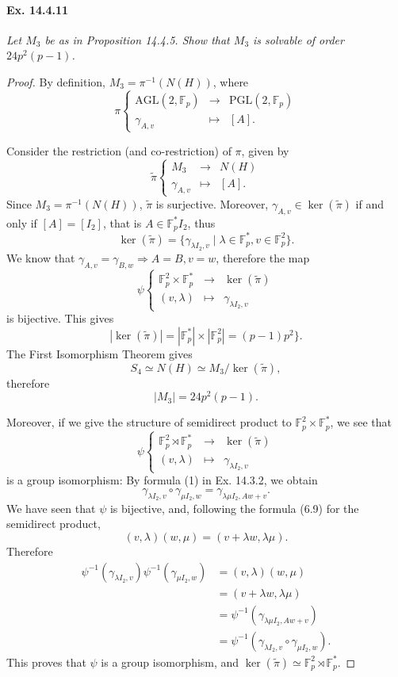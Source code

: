 \documentclass[11pt,a4paper]{article}
\newcommand{\F}{\mathbb{F}}
\begin{document}
{\paragraph{Ex. 14.4.11}{\it Let $M_3$ be as in Proposition 14.4.5. Show that $M_3$ is solvable of order $24p^2(p-1)$.
}
\begin{proof}
By definition, $M_3 = \pi^{-1}(N(H))$, where
$$
\pi
\left\{
\begin{array}{ccc}
\mathrm{AGL}(2,\F_p) & \to & \mathrm{PGL}(2,\F_p)\\
\gamma_{A,v} & \mapsto &[A].
\end{array}
\right.
$$

Consider the restriction (and co-restriction) of $\pi$, given by
$$
\tilde{\pi}
\left\{
\begin{array}{ccc}
M_3& \to &N(H)\\
\gamma_{A,v} & \mapsto &[A].
\end{array}
\right.
$$
Since $M_3 = \pi^{-1}(N(H))$, $\tilde{\pi}$ is surjective.
Moreover, $\gamma_{A,v} \in \ker(\tilde{\pi})$ if and only if $[A] = [I_2]$, that is $A \in \F_p^* I_2$, thus
$$\ker(\tilde{\pi}) = \{ \gamma_{\lambda I_2, v} \mid \lambda \in \F_p^*, v \in \F_p^2\}.$$
We know that $\gamma_{A,v} = \gamma_{B,w} \Rightarrow A = B, v = w$, therefore the map
$$
\psi
\left\{
\begin{array}{ccc}
 \F_p^2\times \F_p^* & \to &\ker(\tilde \pi)\\
(v, \lambda) & \mapsto & \gamma_{\lambda I_2,v}
\end{array} 
\right.
$$
is bijective. This gives
$$
|\ker(\tilde{\pi})| = |\F_p^*| \times |\F_p^2| = (p-1)p^2\}.
$$
The First Isomorphism Theorem gives
$$S_4 \simeq N(H) \simeq M_3/ \ker(\tilde{\pi}),$$
therefore
$$|M_3|= 24 p^2(p-1).$$

Moreover, if we give the structure of semidirect product to $\F_p^2\times \F_p^*$, we see that
$$
\psi
\left\{
\begin{array}{ccc}
 \F_p^2\rtimes \F_p^* & \to &\ker(\tilde \pi)\\
(v, \lambda) & \mapsto & \gamma_{\lambda I_2,v}
\end{array} 
\right.
$$
is a group isomorphism:
By formula (1) in Ex. 14.3.2, we obtain
$$\gamma_{\lambda I_2,v} \circ \gamma_{\mu I_2,w} = \gamma_{\lambda \mu I_2, Aw+v}.$$
We have seen that $\psi$ is bijective, and, following the formula (6.9) for the semidirect product, 
$$(v,\lambda)(w, \mu) = (v + \lambda w, \lambda \mu).$$
Therefore
\begin{align*}
\psi^{-1}(\gamma_{\lambda I_2,v}) \psi^{-1} (\gamma_{\mu I_2,w}) &= (v,\lambda)(w, \mu)\\
&=(v + \lambda w, \lambda \mu)\\
&= \psi^{-1}(\gamma_{\lambda \mu I_2, Aw+v})\\
&=\psi^{-1}(\gamma_{\lambda I_2,v} \circ \gamma_{\mu I_2,w}).
\end{align*}
This proves that $\psi$ is a group isomorphism, and $\ker(\tilde \pi) \simeq \F_p^2 \rtimes \F_p^*$.


\end{proof}}
\end{document}
